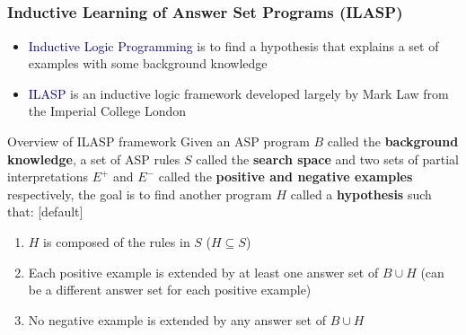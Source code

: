 \documentclass{beamer}
\newcommand\re[1]{\textcolor{darkblue}{#1}}
\begin{document}
\subsection{}
\begin{framefont}{\footnotesize}
  \begin{frame}
    \frametitle{Inductive Learning of Answer Set Programs (ILASP)}
    \begin{itemize}[<+->]
      \item \re{Inductive Logic Programming} is to find a hypothesis that explains a set of examples with some background knowledge
      \item \re{ILASP} is an inductive logic framework developed largely by Mark Law from the Imperial College London
    \end{itemize}
    \pause
      \begin{block}{Overview of ILASP framework}
        Given an ASP program $B$ called the \textbf{background knowledge}, a set of ASP rules $S$ called the \textbf{search space} and two sets of partial interpretations $E^{+}$ and $E^-$ called the \textbf{positive and negative examples} respectively, the goal is to find another program $H$ called a \textbf{hypothesis} such that:
        [default]
        \begin{enumerate}
        \item $H$ is composed of the rules in $S$ ($H \subseteq S$)
        \item Each positive example is extended by at least one answer set of $B \cup H$ (can be a different answer set for each positive example)
        \item No negative example is extended by any answer set of $B \cup H$
        \end{enumerate}
    \end{block}
  \end{frame}
\end{framefont}
\end{document}
